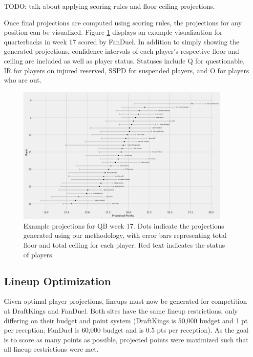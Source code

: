 \documentclass[12pt]{article}
\begin{document}
TODO: talk about applying scoring rules and floor ceiling projections.\bigskip


Once final projections are computed using scoring rules, the projections for any position can be visualized. Figure \ref{qb17} displays an example visualization for quarterbacks in week 17 scored by FanDuel. In addition to simply showing the generated projections, confidence intervals of each player's respective floor and ceiling are included as well as player status. Statuses include Q for questionable, IR for players on injured reserved, SSPD for suspended players, and O for players who are out.

\begin{figure}[H]
  \centering
  \includegraphics[width=0.95\textwidth]{../figures/QB_17}
  \caption{Example projections for QB week 17. Dots indicate the projections generated using our methodology, with error bars representing total floor and total ceiling for each player. Red text indicates the status of players.}
  \label{qb17}
\end{figure}


\subsection{Lineup Optimization}
Given optimal player projections, lineups must now be generated for competition at DraftKings and FanDuel. Both sites have the same lineup restrictions, only differing on their budget and point system (DraftKings is 50,000 budget and 1 pt per reception; FanDuel is 60,000 budget and is 0.5 pts per reception). As the goal is to score as many points as possible, projected points were maximized such that all lineup restrictions were met. \bigskip
\end{document}
